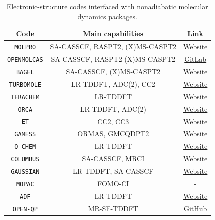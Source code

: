 \documentclass[9pt,bestpractices]{livecoms}
\begin{document}
\begin{table}[h!]
    \centering
    \begin{tabular}{|c|c|c|}
    \hline 
    \textbf{Code}  & \textbf{Main capabilities} & \textbf{Link} \\ 
    \hline
        \texttt{MOLPRO}   & SA-CASSCF, RASPT2, (X)MS-CASPT2 & \href{https://www.molpro.net}{Website}  \\
        \texttt{OPENMOLCAS}   & SA-CASSCF, RASPT2 (X)MS-CASPT2 &  \href{https://gitlab.com/Molcas/OpenMolcas}{GitLab}  \\
        \texttt{BAGEL}   & SA-CASSCF, (X)MS-CASPT2  & \href{https://nubakery.org}{Website}  \\
        \texttt{TURBOMOLE}   & LR-TDDFT, ADC(2), CC2  &  \href{https://www.turbomole.org}{Website}  \\
        \texttt{TERACHEM}   & LR-TDDFT  & \href{http://www.petachem.com}{Website}  \\
        \texttt{ORCA}   & LR-TDDFT, ADC(2) & \href{https://www.faccts.de/orca/}{Website}  \\
        \texttt{ET}   & CC2, CC3 & \href{https://etprogram.org}{Website}  \\
        \texttt{GAMESS}  & ORMAS, GMCQDPT2 & \href{https://www.msg.chem.iastate.edu/gamess/}{Website} \\
        \texttt{Q-CHEM}  & LR-TDDFT & \href{https://www.q-chem.com}{Website}  \\
        \texttt{COLUMBUS}  & SA-CASSCF, MRCI  & \href{https://columbus-program-system.gitlab.io/columbus/}{Website}  \\
        \texttt{GAUSSIAN}  & LR-TDDFT, SA-CASSCF  & \href{https://gaussian.com}{Website}  \\
        \texttt{MOPAC}  & FOMO-CI & -  \\
        \texttt{ADF}  & LR-TDDFT & \href{https://www.scm.com/amsterdam-modeling-suite/adf/}{Website}  \\
        \texttt{OPEN-QP}  & MR-SF-TDDFT & \href{https://github.com/Open-Quantum-Platform/openqp}{GitHub} \\
      \hline
    \end{tabular}
    \caption{Electronic-structure codes interfaced with nonadiabatic molecular dynamics packages.}
    \label{tab:IC2}
\end{table}
\end{document}
